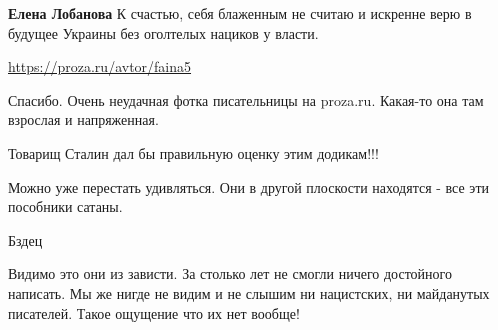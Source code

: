 \begin{itemize}
\begin{itemize}
\textbf{Елена Лобанова} К счастью, себя блаженным не считаю и искренне верю в будущее Украины без оголтелых нациков у власти.
\end{itemize} %

\url{https://proza.ru/avtor/faina5}

Спасибо.
Очень неудачная фотка писательницы на proza.ru.
Какая-то она там взрослая и напряженная.

Товарищ Сталин дал бы правильную оценку этим додикам!!!

Можно уже перестать удивляться. Они в другой плоскости находятся - все эти пособники сатаны.

Бздец

Видимо это они из зависти.
За столько лет не смогли ничего достойного написать.
Мы же нигде не видим и не слышим ни нацистских, ни майданутых писателей. Такое ощущение что их нет вообще!
\end{itemize} %
